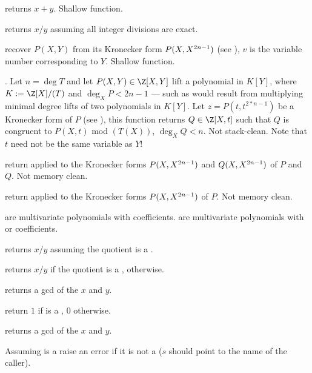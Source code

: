  returns $x+y$. Shallow function.

 returns $x/y$ assuming all integer
divisions are exact.

 recover $P(X,Y)$
from its Kronecker form $P(X,X^{2\*n-1})$ (see ),
$v$ is the variable number corresponding to $Y$. Shallow function.

. Let $n = \deg T$ and let
$P(X,Y)\in \Z[X,Y]$ lift a polynomial in $K[Y]$, where $K := \Z[X]/(T)$ and
$\deg_X P < 2n-1$ --- such as would result from multiplying minimal degree
lifts of two polynomials in $K[Y]$. Let $z = P(t,t^{2*n-1})$ be a Kronecker
form of $P$ (see ), this function returns $Q\in
\Z[X,t]$ such that $Q$ is congruent to $P(X,t)$ mod $(T(X))$, $\deg_X Q <
n$. Not stack-clean. Note that $t$ need not be the same variable as $Y$!

 return 
applied to the Kronecker forms $P(X,X^{2\*n-1})$ and $Q(X,X^{2\*n-1})$
of $P$ and $Q$. Not memory clean.

 return 
applied to the Kronecker forms $P(X,X^{2\*n-1})$
of $P$. Not memory clean.

 are multivariate polynomials with  coefficients.
 are multivariate polynomials with  or  coefficients.

 returns $x/y$ assuming the quotient is a .

 returns $x/y$ if the quotient is a
,  otherwise.

 returns a gcd of the  $x$ and $y$.

 return $1$ if  is a , $0$ otherwise.

 returns a gcd of the  $x$ and $y$.


 Assuming  is a 
raise an error if it is not a  ($s$ should point to the name of the
caller).


